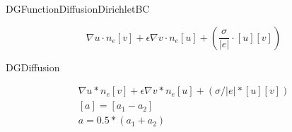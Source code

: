 \documentclass[12pt]{article}
\begin{document}
\begin{comment}
  \begin{align}
    \Gamma_e &= -n_e(\mu_e\cdot\vec{E}-D_e\cdot\nabla n_e) \\
    \Gamma_{\epsilon} &= -n_{\epsilon}(\mu_{\epsilon}\cdot\vec{E}-D_{\epsilon}\cdot\nabla n_{\epsilon}) \\
    n_{\epsilon} &= \frac{3}{2}n_eT_e \\
    \vec{E} &= -\nabla V \\
  \end{align}

  Example of a reaction in R$_{e,i,\epsilon}$:

  \begin{align}
    R_1 &= k_1n_en_{i} \\
    k_1 &= c_1T_e^{0.5}exp(-E_a/T_e)
  \end{align}

\end{comment}

DGFunctionDiffusionDirichletBC

\begin{equation}
  { \nabla u \cdot n_e} [v] + \epsilon { \nabla v \cdot n_e } [u] + (\frac{\sigma}{|e|} \cdot [u][v]) 
\end{equation}

DGDiffusion

\begin{equation*}
\begin{multlined}
{\nabla u * n_e} [v] + \epsilon { \nabla v * n_e } [u] + (\sigma / |e| * [u][v]) \\
[a] = [ a_1 - a_2 ] \\
{a} = 0.5 * (a_1 + a_2)
\end{multlined}
\end{equation*}
\end{document}
